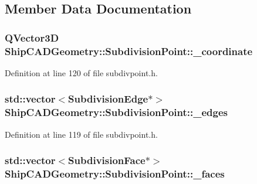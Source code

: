 \subsection{Member Data Documentation}
\hypertarget{classShipCADGeometry_1_1SubdivisionPoint_a7150fdf34fce9bc242b2266313c1c313}{
\subsubsection[{\-\_\-coordinate}]{\setlength{\rightskip}{0pt plus 5cm}Q\-Vector3\-D Ship\-C\-A\-D\-Geometry\-::\-Subdivision\-Point\-::\-\_\-coordinate\hspace{0.3cm}{\ttfamily [protected]}}}\label{classShipCADGeometry_1_1SubdivisionPoint_a7150fdf34fce9bc242b2266313c1c313}


Definition at line 120 of file subdivpoint.\-h.

\hypertarget{classShipCADGeometry_1_1SubdivisionPoint_a1ee85e0a7815d8d737dcd6f654bf15a5}{
\subsubsection[{\-\_\-edges}]{\setlength{\rightskip}{0pt plus 5cm}std\-::vector$<${\bf Subdivision\-Edge}$\ast$$>$ Ship\-C\-A\-D\-Geometry\-::\-Subdivision\-Point\-::\-\_\-edges\hspace{0.3cm}{\ttfamily [protected]}}}\label{classShipCADGeometry_1_1SubdivisionPoint_a1ee85e0a7815d8d737dcd6f654bf15a5}


Definition at line 119 of file subdivpoint.\-h.

\hypertarget{classShipCADGeometry_1_1SubdivisionPoint_aa6e398141f2b296763548ecdf904d200}{
\subsubsection[{\-\_\-faces}]{\setlength{\rightskip}{0pt plus 5cm}std\-::vector$<${\bf Subdivision\-Face}$\ast$$>$ Ship\-C\-A\-D\-Geometry\-::\-Subdivision\-Point\-::\-\_\-faces\hspace{0.3cm}{\ttfamily [protected]}}}\label{classShipCADGeometry_1_1SubdivisionPoint_aa6e398141f2b296763548ecdf904d200}


